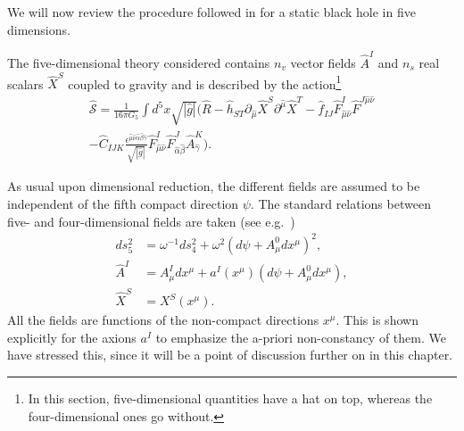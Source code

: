 \documentclass[12pt,twoside]{book}
\begin{document}
We will now review the procedure followed in \cite{Goldstein:2007kx} for a static black hole in five dimensions.

The five-dimensional theory considered contains $n_{v}$ vector fields $\hat{A}^{I}$ and $n_{s}$ real scalars $\hat{X}^{S}$ coupled to gravity and is described by the action\footnote{
In this section, five-dimensional quantities have a hat on top, whereas the four-dimensional ones go without.
}
\begin{equation}\label{goldstein-5D-action}
\begin{split}
\hat{\mathcal{S}} = \frac{1}{16\pi G_{5}} \int d^{5}x \sqrt{|\hat{g}|}
\Big( \hat{R} - \hat{h}_{ST}\partial_{\hat{\mu}}\hat{X}^{S}\partial^{\hat{\mu}}\hat{X}^{T} 
- \hat{f}_{IJ}\hat{F}^{I}_{\hat{\mu}\hat{\nu}} \hat{F}^{J\hat{\mu}\hat{\nu}}\\
- \hat{C}_{IJK} \frac{\epsilon^{\hat{\mu}\hat{\nu}\hat{\alpha}\hat{\beta}\hat{\gamma}}}{\sqrt{|\hat{g}|}} 
\hat{F}^{I}_{\hat{\mu}\hat{\nu}}\hat{F}^{J}_{\hat{\alpha}\hat{\beta}}\hat{A}^{K}_{\hat{\gamma}}
\Big).
\end{split}
\end{equation}

As usual upon dimensional reduction, the different fields are assumed to be independent of the fifth compact direction $\psi$. The standard relations between five- and four-dimensional fields are taken (see e.g.\ \cite{PopeKK})
\begin{equation}\label{KK-Ansatz}
\begin{split}
ds^{2}_{5} &= \omega^{-1}ds^{2}_{4} + \omega^{2}(d\psi + A^{0}_{\mu}dx^{\mu})^{2},\\
\hat{A}^{I} &= A^{I}_{\mu}dx^{\mu} + a^{I}(x^{\mu})(d\psi + A^{0}_{\mu}dx^{\mu}),\\
\hat{X}^{S} &= X^{S}(x^{\mu}).
\end{split}
\end{equation}
All the fields are functions of the non-compact directions $x^{\mu}$. This is shown explicitly for the axions $a^{I}$ to emphasize the a-priori non-constancy of them. We have stressed this, since it will be a point of discussion further on in this chapter.
\end{document}
